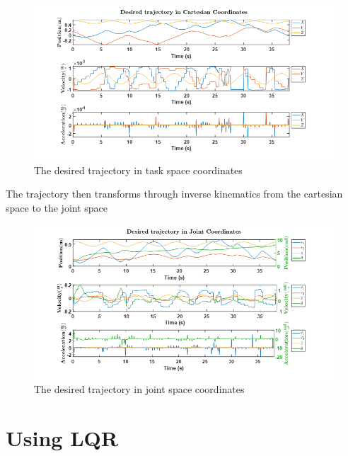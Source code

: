\documentclass{UoNMCHA}
\numberwithin{equation}{section}
\begin{document}
	\begin{figure}[H]
		\begin{center}
			\includegraphics[width=1\linewidth]{figs/Picture25}
			\caption{The desired trajectory in task space coordinates}
			\label{figs/Picture25}
		\end{center}
	\end{figure}
	
	The trajectory then transforms through inverse kinematics from the cartesian space to the joint space
	
	\begin{figure}[H]
		\begin{center}
			\includegraphics[width=1\linewidth]{figs/Picture26}
			\caption{The desired trajectory in joint space coordinates}
			\label{figs/Picture26}
		\end{center}
	\end{figure}

\section{Using LQR}
	
\end{document}
